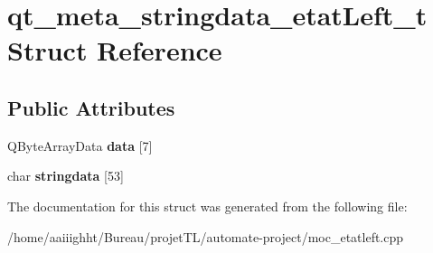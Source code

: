 \hypertarget{structqt__meta__stringdata__etat_left__t}{\section{qt\-\_\-meta\-\_\-stringdata\-\_\-etat\-Left\-\_\-t Struct Reference}
\label{structqt__meta__stringdata__etat_left__t}
}
\subsection*{Public Attributes}
\begin{DoxyCompactItemize}
\item 
\hypertarget{structqt__meta__stringdata__etat_left__t_adda8a68d789969ce2696bb8b8f6ef7ad}{Q\-Byte\-Array\-Data {\bfseries data} \mbox{[}7\mbox{]}}\label{structqt__meta__stringdata__etat_left__t_adda8a68d789969ce2696bb8b8f6ef7ad}

\item 
\hypertarget{structqt__meta__stringdata__etat_left__t_a402cad2f90d2437394ce4f8729cadbe4}{char {\bfseries stringdata} \mbox{[}53\mbox{]}}\label{structqt__meta__stringdata__etat_left__t_a402cad2f90d2437394ce4f8729cadbe4}

\end{DoxyCompactItemize}


The documentation for this struct was generated from the following file\-:\begin{DoxyCompactItemize}
\item 
/home/aaiiighht/\-Bureau/projet\-T\-L/automate-\/project/moc\-\_\-etatleft.\-cpp\end{DoxyCompactItemize}
